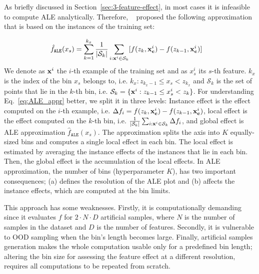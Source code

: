 As briefly discussed in Section~\ref{sec:3-feature-effect}, in most
cases it is infeasible to compute ALE analytically. Therefore,
~\cite{Apley2020} proposed the following approximation that is based
on the instances of the training set:

\begin{align}
  \hat{f}_{\mathtt{ALE}}(x_s) &= \sum_{k=1}^{k_x} \frac{1}{|\mathcal{S}_k|} \sum_{i:\mathbf{x}^i \in \mathcal{S}_k} [f(z_k,\mathbf{x}^i_{\mathbf{c}}) - f(z_{k-1}, \mathbf{x}^i_{\mathbf{c}})]
  \label{eq:ALE_appr}
\end{align}
%
We denote as \( \mathbf{x}^i \) the \(i\)-th example of the training set and
as \(x_s^i\) its \(s\)-th feature. \(k_x\) is the index of the bin
\(x_s\) belongs to, i.e. \(k_x: z_{k_x-1} \leq x_s < z_{k_x} \) and
\(\mathcal{S}_k\) is the set of points that lie in the \(k\)-th bin,
i.e.  \( \mathcal{S}_k = \{ \mathbf{x}^i : z_{k-1} \leq x^i_s < z_{k} \} \).
For understanding Eq.~\eqref{eq:ALE_appr} better, we split it in three
levels: Instance effect is the effect computed on the \(i\)-th
example, i.e.  \(\Delta f_i = f(z_k,\mathbf{x}^i_{\mathbf{c}}) - f(z_{k-1}, \mathbf{x}^i_{\mathbf{c}})\), local
effect is the effect computed on the \(k\)-th bin, i.e.
\(\frac{1}{|\mathcal{S}_k|} \sum_{i:\mathbf{x}^i \in \mathcal{S}_k} \Delta
f_i \), and global effect is ALE approximation
\(\hat{f}_{\mathtt{ALE}}(x_s)\). The approximation splits the axis
into \( K \) equally-sized bins and computes a single local effect in
each bin. The local effect is estimated by averaging the instance
effects of the instances that lie in each bin. Then, the global effect
is the accumulation of the local effects. In ALE approximation, the
number of bins (hyperparameter \(K\)), has two important consequences;
(a) defines the resolution of the ALE plot and (b) affects the
instance effects, which are computed at the bin limits.

This approach has some weaknesses. Firstly, it is computationally
demanding since it evaluates \(f\) for \(2 \cdot N \cdot D\)
artificial samples, where \(N\) is the number of samples in the
dataset and \(D\) is the number of features.  Secondly, it is
vulnerable to OOD sampling when the bin's length becomes large.
Finally, artificial samples generation makes the whole computation
usable only for a predefined bin length; altering the bin size for
assessing the feature effect at a different resolution, requires all
computations to be repeated from scratch.

